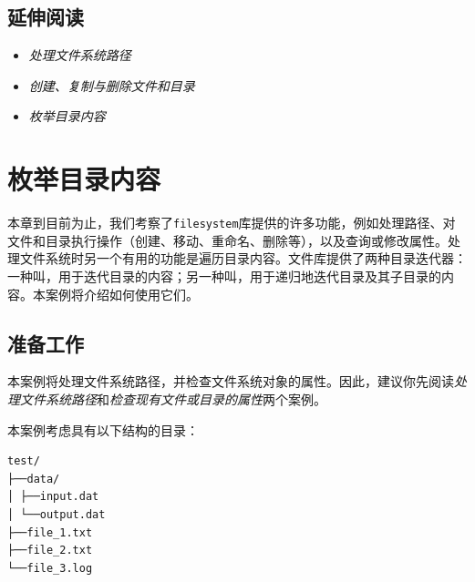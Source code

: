 \begin{itemize}
\end{itemize}



\subsection{延伸阅读}



\begin{itemize}
\item \textit{处理文件系统路径}



\item \textit{创建、复制与删除文件和目录}



\item \textit{枚举目录内容}

\end{itemize}



\section{枚举目录内容}



本章到目前为止，我们考察了\texttt{filesystem}库提供的许多功能，例如处理路径、对文件和目录执行操作（创建、移动、重命名、删除等），以及查询或修改属性。处理文件系统时另一个有用的功能是遍历目录内容。文件库提供了两种目录迭代器：一种叫，用于迭代目录的内容；另一种叫，用于递归地迭代目录及其子目录的内容。本案例将介绍如何使用它们。



\subsection{准备工作}



本案例将处理文件系统路径，并检查文件系统对象的属性。因此，建议你先阅读\textit{处理文件系统路径}和\textit{检查现有文件或目录的属性}两个案例。



本案例考虑具有以下结构的目录：



\begin{codeblockbg}
\begin{Verbatim}[commandchars=\\\{\},breaklines=true,breakanywhere=true,fontsize=\codefont,xleftmargin=17bp,formatcom=\bfseries]
test/
├──data/
│ ├──input.dat
│ └──output.dat
├──file_1.txt
├──file_2.txt
└──file_3.log
\end{Verbatim}
\end{codeblockbg}


